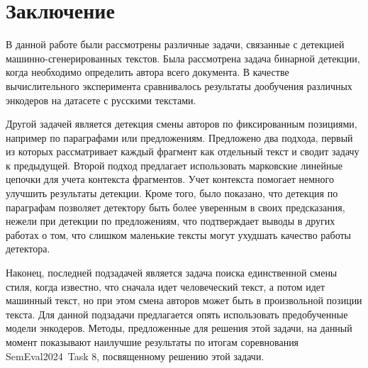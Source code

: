 \section{Заключение}

В данной работе были рассмотрены различные задачи, связанные с детекцией машинно-сгенерированных текстов. Была рассмотрена задача бинарной детекции, когда необходимо определить автора всего документа. В качестве вычислительного эксперимента сравнивалось результаты дообучения различных энкодеров на датасете с русскими текстами.

Другой задачей является детекция смены авторов по фиксированным позициями, например по параграфами или предложениям. Предложено два подхода, первый из которых рассматривает каждый фрагмент как отдельный текст и сводит задачу к предыдущей. Второй подход предлагает использовать марковские линейные цепочки для учета контекста фрагментов. Учет контекста помогает немного улучшить результаты детекции. Кроме того, было показано, что детекция по параграфам позволяет детектору быть более уверенным в своих предсказания, нежели при детекции по предложениям, что подтверждает выводы в других работах о том, что слишком маленькие тексты могут ухудшать качество работы детектора.

Наконец, последней подзадачей является задача поиска единственной смены стиля, когда известно, что сначала идет человеческий текст, а потом идет машинный текст, но при этом смена авторов может быть в произвольной позиции текста. Для данной подзадачи предлагается опять использовать предобученные модели энкодеров. Методы, предложенные для решения этой задачи, на данный момент показывают наилучшие результаты по итогам соревнования SemEval2024~Task 8, посвященному решению этой задачи.